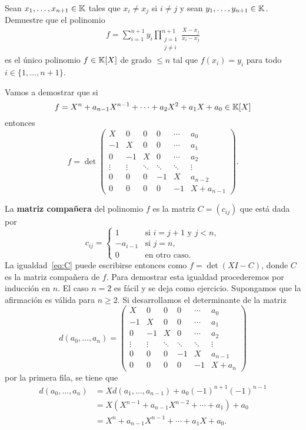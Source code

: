 \begin{xca}
	\label{xca:lagrange}
	Sean $x_1,\dots,x_{n+1}\in\mathbb{K}$ tales que $x_i\ne x_j$ si $i\ne j$ y sean
	$y_1,\dots,y_{n+1}\in\mathbb{K}$. Demuestre que el polinomio
	\begin{align*}
		f=\sum_{i=1}^{n+1}y_i\prod_{\substack{j=1\\j\ne i}}^{n+1}\frac{X-x_j}{x_i-x_j}
	\end{align*}
	es el único polinomio
	$f\in\mathbb{K}[X]$ de grado $\leq n$ tal que $f(x_i)=y_i$ para todo
	$i\in\{1,\dots,n+1\}$. 
\end{xca}

\begin{block}
	Vamos a demostrar que si 
	\[
		f=X^n+a_{n-1}X^{n-1}+\cdots+a_2X^2+a_1X+a_0\in\mathbb{K}[X]
	\]
	entonces 
	\begin{equation}
		\label{eq:C}
		f=
		\det\begin{pmatrix}
			X &  0 & 0 & 0 & \cdots & a_0\\
			-1 &  X & 0 & 0 & \cdots & a_1\\
			0 & -1 & X & 0 & \cdots & a_2\\
			\vdots & \vdots & \ddots & \ddots & \ddots & \vdots\\
			0 & 0 & 0 & -1 & X & a_{n-2} \\
			0 & 0 & 0 & 0 & -1 & X+a_{n-1} 
		\end{pmatrix}.
	\end{equation}

	La \textbf{matriz compañera} del polinomio $f$ es la matriz $C=(c_{ij})$
	que está dada por 
	\[
	c_{ij}=\begin{cases}
		1 & \text{si $i=j+1$ y $j<n$},\\
		-a_{i-1} & \text{si $j=n$},\\
		0 & \text{en otro caso}.
	\end{cases}
	\]
	La igualdad~\eqref{eq:C} puede escribirse entonces como $f=\det(XI-C)$,
	donde $C$ es la matriz compañera de $f$. 
	Para demostrar esta igualdad procederemos por inducción en $n$. El caso $n=2$ es fácil y se deja como
	ejercicio. Supongamos que la afirmación es válida para $n\geq2$. Si desarrollamos 
	el determinante de la matriz
	\[
	d(a_0,\dots,a_n)=
	\begin{pmatrix}
  		 X &  0 & 0 & 0 & \cdots & a_0\\
		-1 &  X & 0 & 0 & \cdots & a_1\\
		 0 & -1 & X & 0 & \cdots & a_2\\
		 \vdots & \vdots & \ddots & \ddots & \ddots & \vdots\\
		 0 & 0 & 0 & -1 & X & a_{n-1} \\
		 0 & 0 & 0 & 0 & -1 & X+a_{n} 
	 \end{pmatrix}
	\]
	por la primera fila, se tiene que
    \begin{align*}
        d(a_0,\dots,a_n)&=Xd(a_1,\dots,a_{n-1})+a_0(-1)^{n+1}(-1)^{n-1}\\
        &=X(X^{n-1}+a_{n-1}X^{n-2}+\cdots+a_1)+a_0\\
        &=X^n+a_{n-1}X^{n-1}+\cdots+a_1X+a_0.
    \end{align*}
\end{block}

